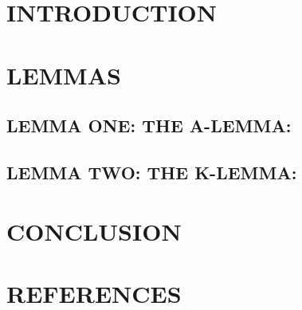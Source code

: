 \documentclass[11pt, a4paper]{article}
\begin{document}
\section{INTRODUCTION}

\section{LEMMAS}

\subsection{LEMMA ONE: THE A-LEMMA:}

\subsection{LEMMA TWO: THE K-LEMMA:}

\section{CONCLUSION}

\section{REFERENCES}
\end{document}
